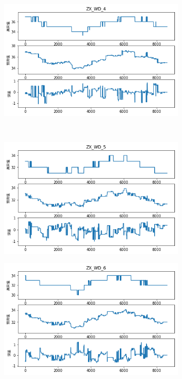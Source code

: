 \begin{figure}[H]
\begin{subfigure}[t]{0.48\textwidth}
\end{subfigure}\hfill
\begin{subfigure}[t]{0.48\textwidth}
    \centering
    \includegraphics[scale=0.45]{figures/sr/ffx-zx_wd_4.png}
\end{subfigure}\\
\begin{subfigure}[t]{0.48\textwidth}
  \centering
  \includegraphics[scale=0.45]{figures/sr/ffx-zx_wd_5.png}
\end{subfigure}\hfill
\begin{subfigure}[t]{0.48\textwidth}
    \centering
    \includegraphics[scale=0.45]{figures/sr/ffx-zx_wd_6.png}

\end{subfigure}
\end{figure}

